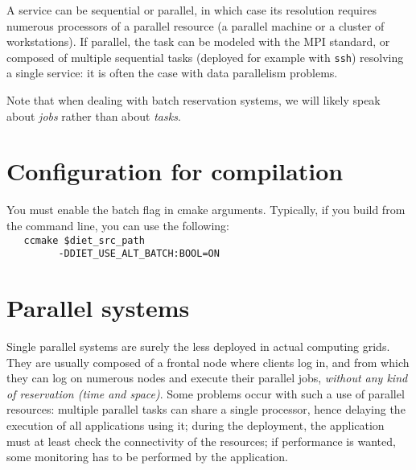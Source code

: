 A service can be sequential or parallel, in which case its resolution
requires numerous processors of a parallel resource (a parallel
machine or a cluster of workstations). If parallel, the task can be
modeled with the MPI standard, or composed of multiple sequential
tasks (deployed for example with \verb!ssh!) resolving a single
service: it is often the case with data parallelism problems.

Note that when dealing with batch reservation systems, we will likely
speak about {\it jobs} rather than about {\it tasks}.

\section{Configuration for compilation}

You must enable the batch flag in cmake arguments. Typically, if you
build \diet from the command line, you can use the following: \\

\verb!   ccmake $diet_src_path !\\
     \verb!         -DDIET_USE_ALT_BATCH:BOOL=ON !



\section{Parallel systems}

Single parallel systems are surely the less deployed in actual computing
grids. They are usually composed of a frontal node where clients log in, and
from which they can log on numerous nodes and execute their parallel jobs, {\it
  without any kind of reservation (time and space)}. Some problems occur with
such a use of parallel resources: multiple parallel tasks can share a single
processor, hence delaying the execution of all applications using it; during
the deployment, the application must at least check the connectivity of the
resources; if performance is wanted, some monitoring has to be performed by the
application.

